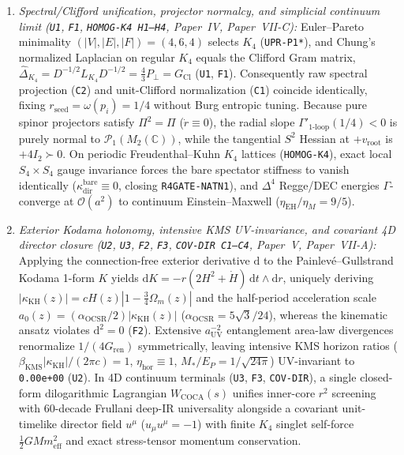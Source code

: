 \documentclass[11pt]{article}
\begin{document}
\begin{enumerate}
\item \emph{Spectral/Clifford unification, projector normalcy, and simplicial continuum limit (\texttt{U1}, \texttt{F1}, \texttt{HOMOG-K4 H1--H4}, Paper~IV, Paper~VII-C):} Euler--Pareto minimality $(|V|,|E|,|F|)=(4,6,4)$ selects $K_4$ (\texttt{UPR-P1*}), and Chung's normalized Laplacian on regular $K_4$ equals the Clifford Gram matrix, $\widehat{\Delta}_{K_4}=D^{-1/2}L_{K_4}D^{-1/2}=\frac{4}{3}P_\perp=G_{\mathrm{Cl}}$ (\texttt{U1}, \texttt{F1}). Consequently raw spectral projection (\texttt{C2}) and unit-Clifford normalization (\texttt{C1}) coincide identically, fixing $r_{\mathrm{seed}}=\omega(p_i)=1/4$ without Burg entropic tuning. Because pure spinor projectors satisfy $\Pi^2=\Pi$ ($\dot{r}\equiv 0$), the radial slope $\Gamma'_{1\text{-loop}}(1/4)<0$ is purely normal to $\mathcal{P}_1(M_2(\mathbb{C}))$, while the tangential $S^2$ Hessian at $+v_{\mathrm{root}}$ is $+4I_2\succ 0$. On periodic Freudenthal--Kuhn $K_4$ lattices (\texttt{HOMOG-K4}), exact local $S_4\times S_4$ gauge invariance forces the bare spectator stiffness to vanish identically ($\kappa_{\mathrm{dir}}^{\mathrm{bare}}\equiv 0$, closing \texttt{R4GATE-NATN1}), and $\Delta^4$ Regge/DEC energies $\Gamma$-converge at $\mathcal{O}(a^2)$ to continuum Einstein--Maxwell ($\eta_{\mathrm{EH}}/\eta_M=9/5$).
\item \emph{Exterior Kodama holonomy, intensive KMS UV-invariance, and covariant 4D director closure (\texttt{U2}, \texttt{U3}, \texttt{F2}, \texttt{F3}, \texttt{COV-DIR C1--C4}, Paper~V, Paper~VII-A):} Applying the connection-free exterior derivative $\mathrm{d}$ to the Painlev\'e--Gullstrand Kodama 1-form $K$ yields $\mathrm{d}K=-r(2H^2+\dot{H})\,\mathrm{d}t\wedge\mathrm{d}r$, uniquely deriving $|\kappa_{\mathrm{KH}}(z)|=cH(z)|1-\frac{3}{4}\Omega_m(z)|$ and the half-period acceleration scale $a_0(z)=(\alpha_{\mathrm{OCSR}}/2)|\kappa_{\mathrm{KH}}(z)|$ ($\alpha_{\mathrm{OCSR}}=5\sqrt{3}/24$), whereas the kinematic ansatz violates $\mathrm{d}^2=0$ (\texttt{F2}). Extensive $a_{\mathrm{UV}}^{-2}$ entanglement area-law divergences renormalize $1/(4G_{\mathrm{ren}})$ symmetrically, leaving intensive KMS horizon ratios ($\beta_{\mathrm{KMS}}|\kappa_{\mathrm{KH}}|/(2\pi c)=1$, $\eta_{\mathrm{hor}}\equiv 1$, $M_*/E_P=1/\sqrt{24\pi}$) UV-invariant to \texttt{0.00e+00} (\texttt{U2}). In 4D continuum terminals (\texttt{U3}, \texttt{F3}, \texttt{COV-DIR}), a single closed-form dilogarithmic Lagrangian $W_{\mathrm{COCA}}(s)$ unifies inner-core $r^2$ screening with 60-decade Frullani deep-IR universality alongside a covariant unit-timelike director field $u^\mu$ ($u_\mu u^\mu=-1$) with finite $K_4$ singlet self-force $\frac{1}{2}GMm_{\mathrm{eff}}^2$ and exact stress-tensor momentum conservation.

\end{enumerate}
\end{document}
